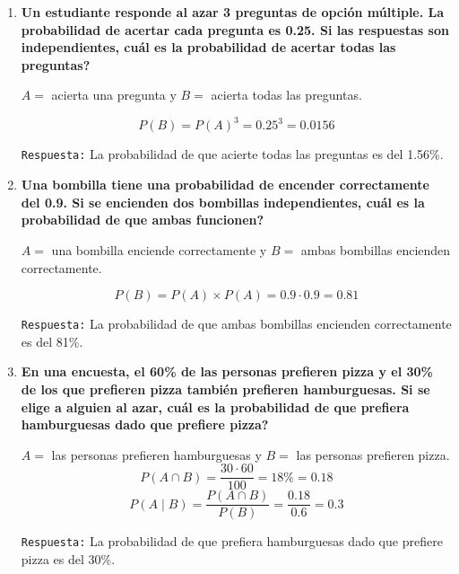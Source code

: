 \documentclass[12pt]{article}
\begin{document}
\begin{enumerate}[label=\textbf{\arabic*.}]
        \item \textbf{Un estudiante responde al azar 3 preguntas de opción múltiple. La probabilidad
        de acertar cada pregunta es 0.25. Si las respuestas son independientes, \textquestiondown cuál es
        la probabilidad de acertar todas las preguntas?}
        
        $A = $ acierta una pregunta y $B = $ acierta todas las preguntas.

        \[P(B) = P(A)^{3} = 0.25^{3} = 0.0156\]

        \texttt{Respuesta:} La probabilidad de que acierte todas las preguntas es del 1.56\%.
        

        
        \item \textbf{Una bombilla tiene una probabilidad de encender correctamente del 0.9. Si se
        encienden dos bombillas independientes, \textquestiondown cuál es la probabilidad de que ambas
        funcionen?}

        $A = $ una bombilla enciende correctamente y $B = $ ambas bombillas encienden correctamente.

        \[P(B) = P(A) \times P(A) = 0.9 \cdot 0.9 = 0.81\]

        \texttt{Respuesta:} La probabilidad de que ambas bombillas encienden correctamente es del 81\%.

        
        
        \item \textbf{En una encuesta, el 60\% de las personas prefieren pizza y el 30\% de los que
        prefieren pizza también prefieren hamburguesas. Si se elige a alguien al azar,
        \textquestiondown cuál es la probabilidad de que prefiera hamburguesas dado que prefiere pizza?}

        $A = $ las personas prefieren hamburguesas y $B = $ las personas prefieren pizza.\\

        \[P(A \cap B) = \frac{30 \cdot 60}{100} = 18\% = 0.18\]
        \[P(A \mid B) = \frac{P(A \cap B)}{P(B)} = \frac{0.18}{0.6} = 0.3\]

        \texttt{Respuesta:} La probabilidad de que prefiera hamburguesas dado que prefiere pizza es del 30\%.
        



\end{enumerate}
\end{document}
